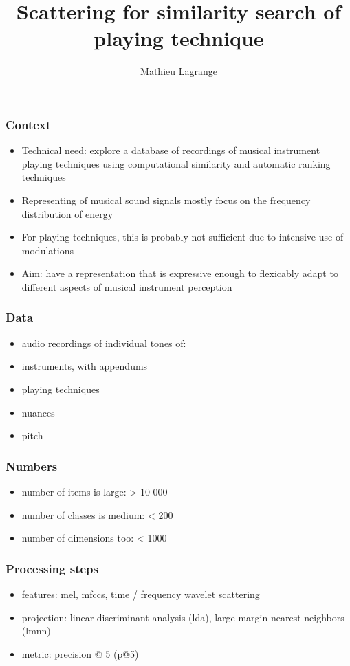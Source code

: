 \documentclass{beamer}
\title{Scattering for similarity search of playing technique}
\author{ Mathieu Lagrange }
\begin{document}
\maketitle

\begin{frame}\frametitle{Context}
  \begin{itemize}
    \item Technical need: explore a database of recordings of musical instrument playing techniques using computational similarity and automatic ranking techniques
    \item Representing of musical sound signals mostly focus on the frequency distribution of energy
    \item For playing techniques, this is probably not sufficient due to intensive use of modulations
    \item Aim: have a representation that is expressive enough to flexicably adapt to different aspects of musical instrument perception
  \end{itemize}
\end{frame}

\begin{frame}\frametitle{Data}
\begin{itemize}
  \item audio recordings of individual tones of:
  \item instruments, with appendums
  \item playing techniques
  \item nuances
  \item pitch
\end{itemize}
\end{frame}

\begin{frame}\frametitle{Numbers}
\begin{itemize}
  \item number of items is large: > 10 000
  \item number of classes is medium: < 200
  \item number of dimensions too: < 1000
\end{itemize}
\end{frame}

\begin{frame}\frametitle{Processing steps}
\begin{itemize}
  \item features: mel, mfccs, time / frequency wavelet scattering
  \item projection: linear discriminant analysis (lda), large margin nearest neighbors (lmnn)
  \item metric: precision @ 5 (p@5)
\end{itemize}
\end{frame}
\end{document}

